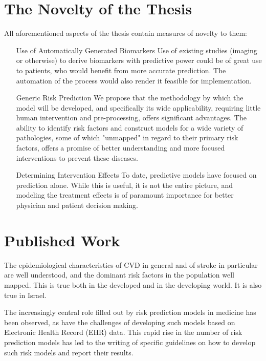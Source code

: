\documentclass[a4paper,12pt]{article}
\begin{document}
	\section{The Novelty of the Thesis}
	
	All aforementioned aspects of the thesis contain measures of novelty to them:
	
	\begin{itemize}
		
		\item[Use of Automatically Generated Biomarkers] Use of existing studies (imaging or otherwise) to derive biomarkers with predictive power could be of great use to patients, who would benefit from more accurate prediction. The automation of the process would also render it feasible for implementation.
		
		\item[Generic Risk Prediction] We propose that the methodology by which the model will be developed, and specifically its wide applicability, requiring little human intervention and pre-processing, offers significant advantages. The ability to identify risk factors and construct models for a wide variety of pathologies, some of which "unmapped" in regard to their primary risk factors, offers a promise of better understanding and more focused interventions to prevent these diseases.
		
		\item[Determining Intervention Effects] To date, predictive models have focused on prediction alone. While this is useful, it is not the entire picture, and modeling the treatment effects is of paramount importance for better physician and patient decision making.
		
	\end{itemize}
	
	\section{Published Work}
	
	The epidemiological characteristics of CVD in general and of stroke in particular are well understood\cite{Koton2014,Vangen-Loenne2017}, and the dominant risk factors in the population well mapped\cite{Yusuf2004,ODonnell2016}. This is true both in the developed and in the developing world\cite{Lozano2012}. It is also true in Israel\cite{ICDC2017}.
	
	The increasingly central role filled out by risk prediction models in medicine has been observed\cite{Moons2009}, as have the challenges of developing such models based on Electronic Health Record (EHR) data\cite{Goldstein2016,Goldstein2017}. This rapid rise in the number of risk prediction models has led to the writing of specific guidelines on how to develop such risk models and report their results\cite{Collins2015}.
	
\end{document}
